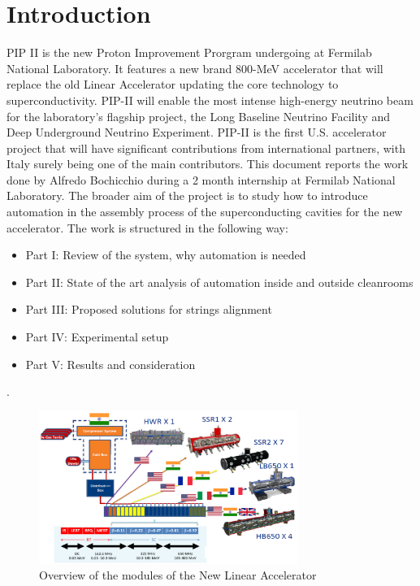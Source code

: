 \documentclass[12pt,a4paper]{article}
\begin{document}
\section{Introduction}
\newline
PIP II is the new Proton Improvement Prorgram undergoing at Fermilab National Laboratory. It features a new brand 800-MeV accelerator that will replace the old Linear Accelerator updating the core technology to superconductivity. PIP-II will enable the most intense high-energy neutrino beam for the laboratory’s flagship project, the Long Baseline Neutrino Facility and Deep Underground Neutrino Experiment.
PIP-II is the first U.S. accelerator project that will have significant contributions from international partners, with Italy surely being one of the main contributors.
\newline
This document reports the work done by Alfredo Bochicchio during a 2 month internship at Fermilab National Laboratory. The broader aim of the project is to study how to introduce automation in the assembly process of the superconducting cavities for the new accelerator. The work is structured in the following way:
\begin{itemize}
    \item Part I: Review of the system, why automation is needed
    \item Part II: State of the art analysis of automation inside and outside cleanrooms 
    \item Part III: Proposed solutions for strings alignment
    \item Part IV: Experimental setup
    \item Part V: Results and consideration
\end{itemize}. 
\begin{figure}[h!]
\centering
\includegraphics[width=0.75\textwidth]{20.png}
\caption{Overview of the modules of the New Linear Accelerator}
\end{figure}
\end{document}
